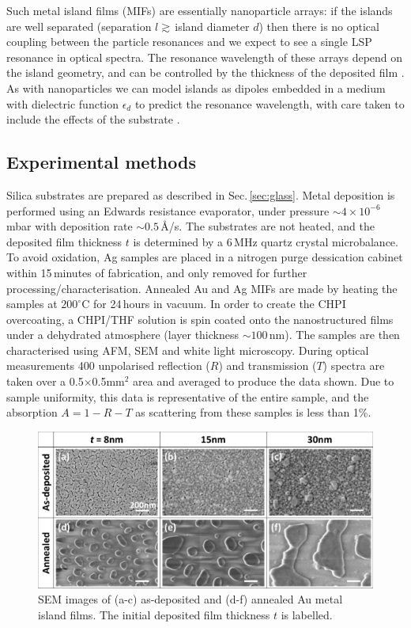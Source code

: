 Such metal island films (MIFs) are essentially nanoparticle arrays: if the islands are well separated (separation $l \gtrsim\,	$island diameter $d$) then there is no optical coupling between the particle resonances and we expect to see a single LSP resonance in optical spectra. The resonance wavelength of these arrays depend on the island geometry, and can be controlled by the thickness of the deposited film \cite{Walter2006, Sennett1950, Gupta2002, Gadenne2002, Lee1992}. As with nanoparticles we can model islands as dipoles embedded in a medium with dielectric function $\epsilon_d$ to predict the resonance wavelength, with care taken to include the effects of the substrate \cite{Yamaguchi1960, Yamaguchi1972, Yamaguchi1973, Doremus1966}.

\subsection{Experimental methods}
Silica substrates are prepared as described in Sec.\,\ref{sec:glass}. Metal deposition is performed using an Edwards resistance evaporator, under pressure $\sim4\times10^{-6}$\,mbar with deposition rate $\sim0.5$\,\AA/s. The substrates are not heated, and the deposited film thickness $t$ is determined by a 6\,MHz quartz crystal microbalance. To avoid oxidation, Ag samples are placed in a nitrogen purge dessication cabinet within 15\,minutes of fabrication, and only removed for further processing/characterisation. Annealed Au and Ag MIFs are made by heating the samples at $200^{\circ}$C for 24\,hours in vacuum. In order to create the CHPI overcoating, a CHPI/THF solution is spin coated onto the nanostructured films under a dehydrated atmosphere (layer thickness $\sim100$\,nm). The samples are then characterised using AFM, SEM and white light microscopy. During optical measurements 400 unpolarised reflection ($R$) and transmission ($T$) spectra are taken over a 0.5$\times$0.5mm$^{2}$ area and averaged to produce the data shown. Due to sample uniformity, this data is representative of the entire sample, and the absorption $A = 1 - R - T$ as scattering from these samples is less than 1\%.

\begin{figure}[h!] 
\centering    
\includegraphics[width=\textwidth]{Fig1}
\caption{SEM images of (a-c) as-deposited and (d-f) annealed Au metal island films. The initial deposited film thickness $t$ is labelled.}
\label{6Fig1}
\end{figure}
